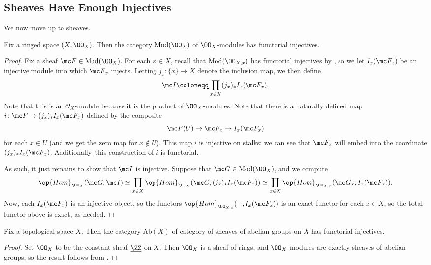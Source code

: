 \documentclass[../notes.tex]{subfiles}
\begin{document}
\subsection{Sheaves Have Enough Injectives}
We now move up to sheaves.
\begin{theorem} \label{thm:mod-ox-inj}
	Fix a ringed space $(X,\OO_X)$. Then the category $\mathrm{Mod}(\OO_X)$ of $\OO_X$-modules has functorial injectives.
\end{theorem}
\begin{proof}
	Fix a sheaf $\mc F\in\mathrm{Mod}(\OO_X)$. For each $x\in X$, recall that $\mathrm{Mod}(\OO_{X,x})$ has functorial injectives by , so we let $I_x(\mc F_x)$ be an injective module into which $\mc F_x$ injects. Letting $j_x\colon\{x\}\to X$ denote the inclusion map, we then define
	\[\mc I\coloneqq\prod_{x\in X}(j_x)_*I_x(\mc F_x).\]
	Note that this is an $\mathcal O_X$-module because it is the product of $\OO_X$-modules. Note that there is a naturally defined map $i\colon\mc F\to(j_x)_*I_x(\mc F_x)$ defined by the composite
	\[\mc F(U)\to\mc F_x\to I_x(\mc F_x)\]
	for each $x\in U$ (and we get the zero map for $x\notin U$). This map $i$ is injective on stalks: we can see that $\mc F_x$ will embed into the coordinate $(j_x)_*I_x(\mc F_x)$. Additionally, this construction of $i$ is functorial.

	As such, it just remains to show that $\mc I$ is injective. Suppose that $\mc G\in\mathrm{Mod}(\OO_X)$, and we compute
	\[\op{Hom}_{\OO_X}(\mc G,\mc I)\simeq\prod_{x\in X}\op{Hom}_{\OO_X}(\mc G,(j_x)_*I_x(\mc F_x))\simeq\prod_{x\in X}\op{Hom}_{\OO_{X,x}}(\mc G_x,I_x(\mc F_x)).\]
	Now, each $I_x(\mc F_x)$ is an injective object, so the functors $\op{Hom}_{\OO_{X,x}}(-,I_x(\mc F_x))$ is an exact functor for each $x\in X$, so the total functor above is exact, as needed.
\end{proof}
\begin{corollary} \label{cor:ab-x-enough-inj}
	Fix a topological space $X$. Then the category $\mathrm{Ab}(X)$ of category of sheaves of abelian groups on $X$ has functorial injectives.
\end{corollary}
\begin{proof}
	Set $\OO_X$ to be the constant sheaf $\underline{\ZZ}$ on $X$. Then $\OO_X$ is a sheaf of rings, and $\OO_X$-modules are exactly sheaves of abelian groups, so the result follows from .
\end{proof}
\end{document}

